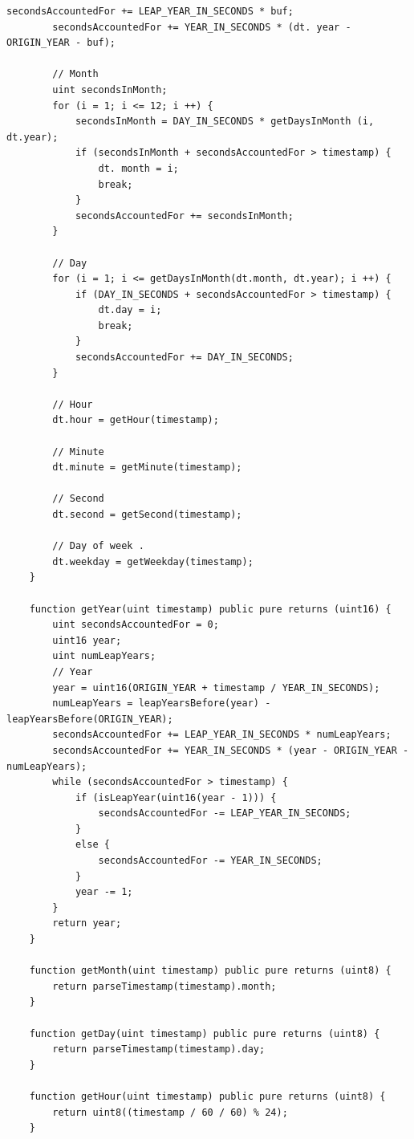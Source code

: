 \documentclass[a4paper]{article}
\begin{document}
\begin{frame}
\begin{lstlisting}[basicstyle=\small]
        secondsAccountedFor += LEAP_YEAR_IN_SECONDS * buf;
        secondsAccountedFor += YEAR_IN_SECONDS * (dt. year - ORIGIN_YEAR - buf);

        // Month
        uint secondsInMonth;
        for (i = 1; i <= 12; i ++) {
            secondsInMonth = DAY_IN_SECONDS * getDaysInMonth (i, dt.year);
            if (secondsInMonth + secondsAccountedFor > timestamp) {
                dt. month = i;
                break;
            }
            secondsAccountedFor += secondsInMonth;
        }

        // Day
        for (i = 1; i <= getDaysInMonth(dt.month, dt.year); i ++) {
            if (DAY_IN_SECONDS + secondsAccountedFor > timestamp) {
                dt.day = i;
                break;
            }
            secondsAccountedFor += DAY_IN_SECONDS;
        }

        // Hour
        dt.hour = getHour(timestamp);

        // Minute
        dt.minute = getMinute(timestamp);

        // Second
        dt.second = getSecond(timestamp);

        // Day of week .
        dt.weekday = getWeekday(timestamp);
    }

    function getYear(uint timestamp) public pure returns (uint16) {
        uint secondsAccountedFor = 0;
        uint16 year;
        uint numLeapYears;
        // Year
        year = uint16(ORIGIN_YEAR + timestamp / YEAR_IN_SECONDS);
        numLeapYears = leapYearsBefore(year) - leapYearsBefore(ORIGIN_YEAR);
        secondsAccountedFor += LEAP_YEAR_IN_SECONDS * numLeapYears;
        secondsAccountedFor += YEAR_IN_SECONDS * (year - ORIGIN_YEAR - numLeapYears);
        while (secondsAccountedFor > timestamp) {
            if (isLeapYear(uint16(year - 1))) {
                secondsAccountedFor -= LEAP_YEAR_IN_SECONDS;
            }
            else {
                secondsAccountedFor -= YEAR_IN_SECONDS;
            }
            year -= 1;
        }
        return year;
    }
    
    function getMonth(uint timestamp) public pure returns (uint8) {
        return parseTimestamp(timestamp).month;
    }
    
    function getDay(uint timestamp) public pure returns (uint8) {
        return parseTimestamp(timestamp).day;
    }
    
    function getHour(uint timestamp) public pure returns (uint8) {
        return uint8((timestamp / 60 / 60) % 24);
    }
    

\end{lstlisting}
\end{frame}
\end{document}
